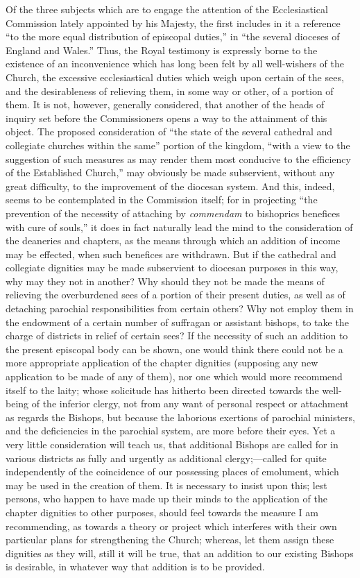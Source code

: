 Of the three subjects which are to engage the
attention of the Ecclesiastical Commission lately appointed by his
Majesty, the first includes in it a reference ``to the more equal
distribution of episcopal duties,'' in ``the several dioceses of England
and Wales.'' Thus, the Royal testimony is expressly borne to the
existence of an inconvenience which has long been felt by all
well-wishers of the Church, the excessive ecclesiastical duties which
weigh upon certain of the sees, and the desirableness of relieving
them, in some way or other, of a portion of them. It is not, however,
generally considered, that another of the heads of inquiry set before
the Commissioners opens a way to the attainment of this object. The
proposed consideration of ``the state of the several cathedral and
collegiate churches within the same'' portion of the kingdom, ``with a
view to the suggestion of such measures as may render them most
conducive to the efficiency of the Established Church,'' may obviously
be made subservient, without any great difficulty, to the improvement
of the diocesan system. And this, indeed, seems to be contemplated in
the Commission itself; for in projecting ``the prevention of the
necessity of attaching by \emph{commendam} to bishoprics benefices
with cure of souls,'' it does in fact naturally lead the mind to the
consideration of the deaneries and chapters, as the means through
which an addition of income may be effected, when such benefices are
withdrawn. But if the cathedral and collegiate dignities may be made
subservient to diocesan purposes in this way, why may they not in
another? Why should they not be made the means of relieving the
overburdened sees of a portion of their present duties, as well as of
detaching parochial responsibilities from certain others? Why not
employ them in the endowment of a certain number of suffragan or
assistant bishops, to take the charge of districts in relief of
certain sees? If the necessity of such an addition to the present
episcopal body can be shown, one would think there could not be a more
appropriate application of the chapter dignities (supposing any new
application to be made of any of them), nor one which would more
recommend itself to the laity; whose solicitude has hitherto been
directed towards the well-being of the inferior clergy, not from any
want of personal respect or attachment as regards the Bishops, but
because the laborious exertions of parochial ministers, and the
deficiencies in the parochial system, are more before their eyes. Yet
a very little consideration will teach us, that additional Bishops are
called for in various districts as fully and urgently as additional
clergy;—called for quite independently of the coincidence of our
possessing places of emolument, which may be used in the creation of
them. It is necessary to insist upon this; lest persons, who happen to
have made up their minds to the application of the chapter dignities
to other purposes, should feel towards the measure I am recommending,
as towards a theory or project which interferes with their own
particular plans for strengthening the Church; whereas, let them
assign these dignities as they will, still it will be true, that an
addition to our existing Bishops is desirable, in whatever way that
addition is to be provided.

